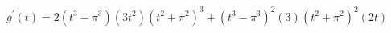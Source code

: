 $ \displaystyle g^{\prime}(t) = 2(t^3 - \pi^3)(3t^2) (t^2 + \pi^2)^3 + (t^3 - \pi^3)^2 (3)(t^2 + \pi^2)^2(2t) $